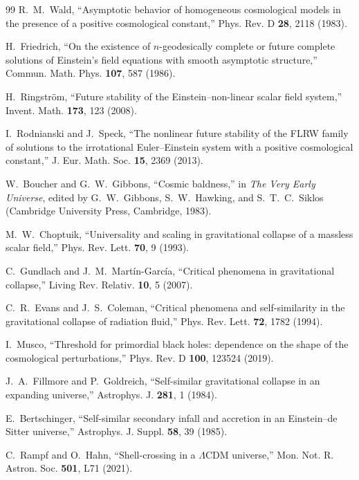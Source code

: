 \documentclass[11pt,letterpaper]{article}
\begin{document}
\begin{thebibliography}{99}
 R.~M.~Wald, ``Asymptotic behavior of homogeneous cosmological models in the presence of a positive cosmological constant,'' Phys. Rev. D \textbf{28}, 2118 (1983).

 H.~Friedrich, ``On the existence of $n$-geodesically complete or future complete solutions of Einstein's field equations with smooth asymptotic structure,'' Commun. Math. Phys. \textbf{107}, 587 (1986).

 H.~Ringstr\"om, ``Future stability of the Einstein--non-linear scalar field system,'' Invent. Math. \textbf{173}, 123 (2008).

 I.~Rodnianski and J.~Speck, ``The nonlinear future stability of the FLRW family of solutions to the irrotational Euler--Einstein system with a positive cosmological constant,'' J. Eur. Math. Soc. \textbf{15}, 2369 (2013).

 W.~Boucher and G.~W.~Gibbons, ``Cosmic baldness,'' in \emph{The Very Early Universe}, edited by G.~W.~Gibbons, S.~W.~Hawking, and S.~T.~C.~Siklos (Cambridge University Press, Cambridge, 1983).

 M.~W.~Choptuik, ``Universality and scaling in gravitational collapse of a massless scalar field,'' Phys. Rev. Lett. \textbf{70}, 9 (1993).

 C.~Gundlach and J.~M.~Mart\'in-Garc\'ia, ``Critical phenomena in gravitational collapse,'' Living Rev. Relativ. \textbf{10}, 5 (2007).

 C.~R.~Evans and J.~S.~Coleman, ``Critical phenomena and self-similarity in the gravitational collapse of radiation fluid,'' Phys. Rev. Lett. \textbf{72}, 1782 (1994).

 I.~Musco, ``Threshold for primordial black holes: dependence on the shape of the cosmological perturbations,'' Phys. Rev. D \textbf{100}, 123524 (2019).

 J.~A.~Fillmore and P.~Goldreich, ``Self-similar gravitational collapse in an expanding universe,'' Astrophys. J. \textbf{281}, 1 (1984).

 E.~Bertschinger, ``Self-similar secondary infall and accretion in an Einstein--de Sitter universe,'' Astrophys. J. Suppl. \textbf{58}, 39 (1985).

 C.~Rampf and O.~Hahn, ``Shell-crossing in a $\Lambda$CDM universe,'' Mon. Not. R. Astron. Soc. \textbf{501}, L71 (2021).


\end{thebibliography}
\end{document}

